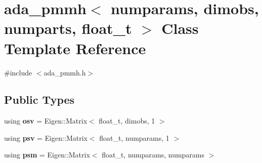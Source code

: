 \hypertarget{classada__pmmh}{}\section{ada\+\_\+pmmh$<$ numparams, dimobs, numparts, float\+\_\+t $>$ Class Template Reference}
\label{classada__pmmh}


{\ttfamily \#include $<$ada\+\_\+pmmh.\+h$>$}

\subsection*{Public Types}
\begin{DoxyCompactItemize}
\item 
\mbox{\label{classada__pmmh_a1ebb1b6caf7763fbb6e1be295e598655}} 
using {\bfseries osv} = Eigen\+::\+Matrix$<$ float\+\_\+t, dimobs, 1 $>$
\item 
\mbox{\label{classada__pmmh_a2922fc665daa094385db972d71c491f8}} 
using {\bfseries psv} = Eigen\+::\+Matrix$<$ float\+\_\+t, numparams, 1 $>$
\item 
\mbox{\label{classada__pmmh_a3de83c1cf02771d59c838c1072f78420}} 
using {\bfseries psm} = Eigen\+::\+Matrix$<$ float\+\_\+t, numparams, numparams $>$
\end{DoxyCompactItemize}
